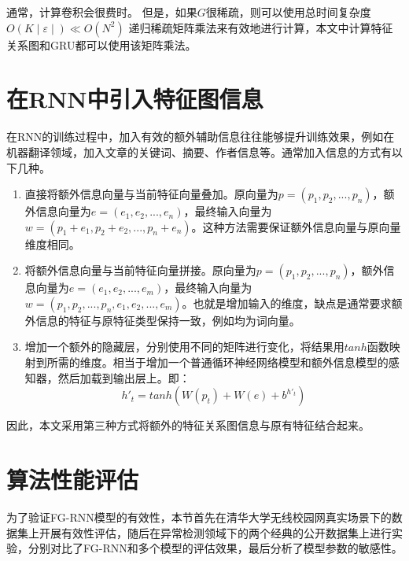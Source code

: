 通常，计算卷积会很费时。 但是，如果$G$很稀疏，则可以使用总时间复杂度 $O(K \mid \varepsilon \mid) \ll O(N^ 2)$ 递归稀疏矩阵乘法来有效地进行计算，本文中计算特征关系图和GRU都可以使用该矩阵乘法。



\section{在RNN中引入特征图信息}
在RNN的训练过程中，加入有效的额外辅助信息往往能够提升训练效果，例如在机器翻译领域，加入文章的关键词、摘要、作者信息等。通常加入信息的方式有以下几种。

\begin{enumerate}
  \item 直接将额外信息向量与当前特征向量叠加。原向量为$p=(p_1,p_2,...,p_n)$，额外信息向量为$e=(e_1,e_2,...,e_n)$，最终输入向量为$w=(p_1+e_1,p_2+e_2,...,p_n+e_n)$。这种方法需要保证额外信息向量与原向量维度相同。
  \item 将额外信息向量与当前特征向量拼接。原向量为$p=(p_1,p_2,...,p_n)$，额外信息向量为$e=(e_1,e_2,...,e_m)$，最终输入向量为$w=(p_1,p_2,...,p_n,e_1,e_2,...,e_m)$。也就是增加输入的维度，缺点是通常要求额外信息的特征与原特征类型保持一致，例如均为词向量。
  \item 增加一个额外的隐藏层，分别使用不同的矩阵进行变化，将结果用$tanh$函数映射到所需的维度。相当于增加一个普通循环神经网络模型和额外信息模型的感知器，然后加载到输出层上。即：
  \begin{equation}
    h'_t= tanh(W(p_t) + W(e) + b^{h'_t})
  \end{equation}
\end{enumerate}
因此，本文采用第三种方式将额外的特征关系图信息与原有特征结合起来。

\section{算法性能评估}
为了验证FG-RNN模型的有效性，本节首先在清华大学无线校园网真实场景下的数据集上开展有效性评估，随后在异常检测领域下的两个经典的公开数据集上进行实验，分别对比了FG-RNN和多个模型的评估效果，最后分析了模型参数的敏感性。


